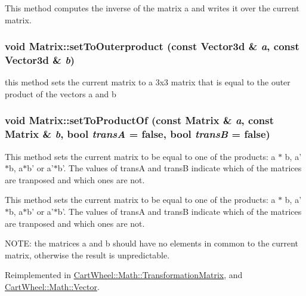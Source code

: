 This method computes the inverse of the matrix a and writes it over the current matrix. \hypertarget{classCartWheel_1_1Math_1_1Matrix_a3168ef0ced8aa0c414f45049d6db5637}{
\subsubsection[{setToOuterproduct}]{\setlength{\rightskip}{0pt plus 5cm}void Matrix::setToOuterproduct (const {\bf Vector3d} \& {\em a}, \/  const {\bf Vector3d} \& {\em b})}}
\label{classCartWheel_1_1Math_1_1Matrix_a3168ef0ced8aa0c414f45049d6db5637}
this method sets the current matrix to a 3x3 matrix that is equal to the outer product of the vectors a and b \hypertarget{classCartWheel_1_1Math_1_1Matrix_ac2f4452cecbb5ffdaf6df379229fa22e}{
\subsubsection[{setToProductOf}]{\setlength{\rightskip}{0pt plus 5cm}void Matrix::setToProductOf (const {\bf Matrix} \& {\em a}, \/  const {\bf Matrix} \& {\em b}, \/  bool {\em transA} = {\ttfamily false}, \/  bool {\em transB} = {\ttfamily false})}}
\label{classCartWheel_1_1Math_1_1Matrix_ac2f4452cecbb5ffdaf6df379229fa22e}
This method sets the current matrix to be equal to one of the products: a $\ast$ b, a'$\ast$b, a$\ast$b' or a'$\ast$b'. The values of transA and transB indicate which of the matrices are tranposed and which ones are not.

This method sets the current matrix to be equal to one of the products: a $\ast$ b, a'$\ast$b, a$\ast$b' or a'$\ast$b'. The values of transA and transB indicate which of the matrices are tranposed and which ones are not.

NOTE: the matrices a and b should have no elements in common to the current matrix, otherwise the result is unpredictable. 

Reimplemented in \hyperlink{classCartWheel_1_1Math_1_1TransformationMatrix_aa30793678e416efa275e9ede54650bff}{CartWheel::Math::TransformationMatrix}, and \hyperlink{classCartWheel_1_1Math_1_1Vector_a3c20feee35a90b2b4da394d7851a0437}{CartWheel::Math::Vector}.

